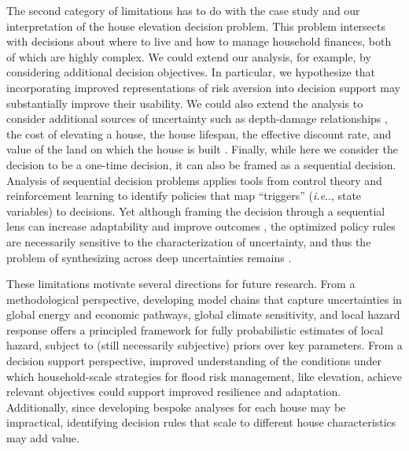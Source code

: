 \documentclass[11pt]{article}
\makeatletter
\DeclareRobustCommand\onedot{\futurelet\@let@token\@onedot}
\def\@onedot{\ifx\@let@token.\else.\null\fi\xspace}
\def\ie{\emph{i.e}\onedot} \def\Ie{\emph{I.e}\onedot}
\DeclareRobustCommand\onedot{\futurelet\@let@token\@onedot}
\def\@onedot{\ifx\@let@token.\else.\null\fi\xspace}
\def\ie{\emph{i.e}\onedot} \def\Ie{\emph{I.e}\onedot}
\makeatother
\begin{document}
The second category of limitations has to do with the case study and our interpretation of the house elevation decision problem.
This problem intersects with decisions about where to live and how to manage household finances, both of which are highly complex.
We could extend our analysis, for example, by considering additional decision objectives.
In particular, we hypothesize that incorporating improved representations of risk aversion into decision support may substantially improve their usability.
We could also extend the analysis to consider additional sources of uncertainty such as depth-damage relationships \citep{Rozer:2019,nofal_fragility:2020}, the cost of elevating a house, the house lifespan, the effective discount rate, and value of the land on which the house is built \citep[provides a framework for addressing some of these]{zarekarizi_suboptimal:2020}.
Finally, while here we consider the decision to be a one-time decision, it can also be framed as a sequential decision.
Analysis of sequential decision problems applies tools from control theory and reinforcement learning to identify policies that map ``triggers'' (\ie, state variables) to decisions.
Yet although framing the decision through a sequential lens can increase adaptability and improve outcomes \citep{fletcher:2017,garner_slrise:2018}, the optimized policy rules are necessarily sensitive to the characterization of uncertainty, and thus the problem of synthesizing across deep uncertainties remains \citep{herman_control:2020}.

These limitations motivate several directions for future research.
From a methodological perspective, developing model chains that capture uncertainties in global energy and economic pathways, global climate sensitivity, and local hazard response \citep[see fig.~1 of][]{moss_uncertainties:2000} offers a principled framework for fully probabilistic estimates of local hazard, subject to (still necessarily subjective) priors over key parameters.
From a decision support perspective, improved understanding of the conditions under which household-scale strategies for flood risk management, like elevation, achieve relevant objectives could support improved resilience and adaptation.
Additionally, since developing bespoke analyses for each house may be impractical, identifying decision rules that scale to different house characteristics may add value.
\end{document}
